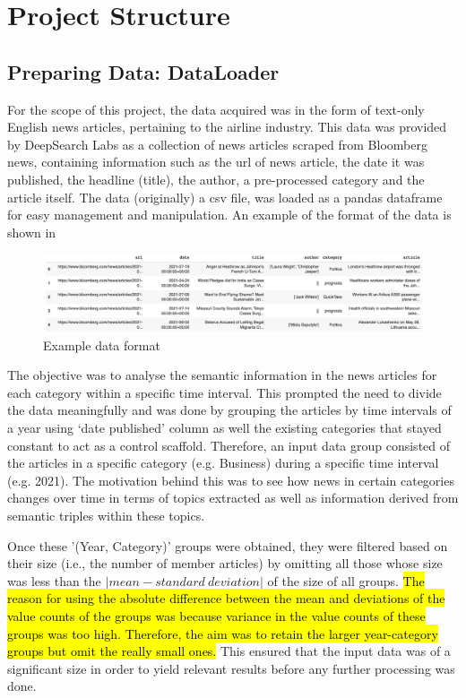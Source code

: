 \chapter{Project Structure}
\vspace{-2ex}

\section{Preparing Data: DataLoader} \label{dataloader}

For the scope of this project, the data acquired was in the form of text-only English news articles, pertaining to the airline industry. This data was provided by DeepSearch Labs as a collection of news articles scraped from Bloomberg news, containing information such as the url of news article, the date it was published, the headline (title), the author, a pre-processed category and the article itself. The data (originally) a csv file, was loaded as a pandas dataframe for easy management and manipulation. An example of the format of the data is shown in~

\begin{figure}[H] 
\centering
\includegraphics[width=0.8\linewidth]{images/dataframe.png}
\caption{Example data format}
\label{dataframe}
\end{figure}

The objective was to analyse the semantic information in the news articles for each category within a specific time interval. This prompted the need to divide the data meaningfully and was done by grouping the articles by time intervals of a year using `date published' column as well the existing categories that stayed constant to act as a control scaffold. Therefore, an input data group consisted of the articles in a specific category (e.g. Business) during a specific time interval (e.g. 2021). The motivation behind this was to see how news in certain categories changes over time in terms of topics extracted as well as information derived from semantic triples within these topics.

Once these '(Year, Category)' groups were obtained, they were filtered based on their size (i.e., the number of member articles) by omitting all those whose size was less than the $| mean - standard \ deviation |$ of the size of all groups. \hl{The reason for using the absolute difference between the mean and deviations of the value counts of the groups was because variance in the value counts of these groups was too high. Therefore, the aim was to retain the larger year-category groups but omit the really small ones.} This ensured that the input data was of a significant size in order to yield relevant results before any further processing was done.  

